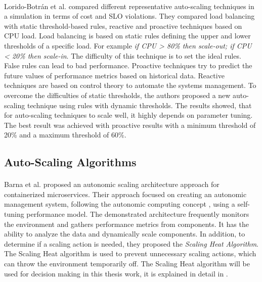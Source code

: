 \paragraph{}
Lorido-Botrán et al.  \cite{Botran2013AutoScalingComp} compared different representative auto-scaling techniques in a simulation in terms of cost and SLO violations. They compared load balancing with static threshold-based rules, reactive and proactive techniques based on CPU load.
Load balancing is based on static rules defining the upper and lower thresholds of a specific load. For example \textit{if CPU > 80\% then scale-out; if CPU < 20\% then scale-in}. The difficulty of this technique is to set the ideal rules. False rules can lead to bad performance. Proactive techniques try to predict the future values of performance metrics based on historical data. Reactive techniques are based on control theory to automate the systems management. To overcome the difficulties of static thresholds, the authors proposed a new auto-scaling technique using rules with dynamic thresholds. The results showed, that for auto-scaling techniques to scale well, it highly depends on parameter tuning. The best result was achieved with proactive results with a minimum threshold of 20\% and a maximum threshold of 60\%.


\subsection{Auto-Scaling Algorithms}
\paragraph{}Barna et al. \cite{Barna2017ElasticContainerApps} proposed an autonomic scaling architecture approach for containerized microservices. Their approach focused on creating an autonomic management system, following the autonomic computing concept \cite{Kephart2003VisionComputing}, using a self-tuning performance model. The demonstrated architecture frequently monitors the environment and gathers performance metrics from components. It has the ability to analyze the data and dynamically scale components. In addition, to determine if a scaling action is needed, they proposed the \textit{Scaling Heat Algorithm}. The Scaling Heat algorithm is used to prevent unnecessary scaling actions, which can throw the environment temporarily off.
The Scaling Heat algorithm will be used for decision making in this thesis work, it is explained in detail in .



